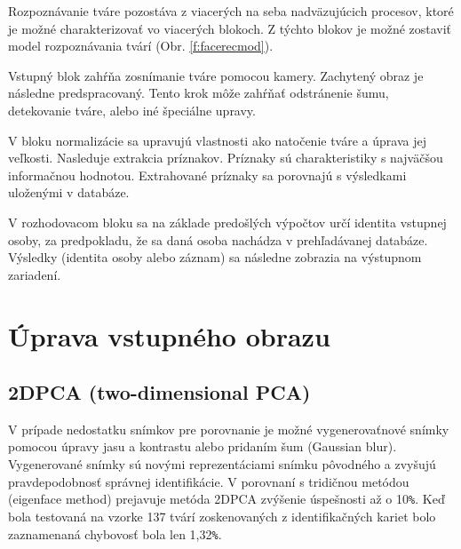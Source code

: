 \documentclass[10pt,twoside,slovak,a4paper]{article}
\begin{document}
Rozpoznávanie tváre pozostáva z viacerých na seba nadväzujúcich procesov, ktoré je možné
charakterizovať vo viacerých blokoch. Z týchto blokov je možné zostaviť model
rozpoznávania tvárí (Obr.  \ref{f:facerecmod}).

Vstupný blok zahŕňa zosnímanie tváre pomocou kamery. Zachytený obraz je následne
predspracovaný. Tento krok môže zahŕňať odstránenie šumu, detekovanie tváre, alebo iné
špeciálne upravy.

V bloku normalizácie sa upravujú vlastnosti ako natočenie tváre a úprava jej veľkosti.
Nasleduje extrakcia príznakov. Príznaky sú charakteristiky s najväčšou informačnou hodnotou.
Extrahované príznaky sa porovnajú s výsledkami uloženými v databáze.

V rozhodovacom bloku sa na základe predošlých výpočtov určí identita vstupnej osoby, za
predpokladu, že sa daná osoba nachádza v prehľadávanej databáze.
Výsledky (identita osoby alebo záznam) sa následne zobrazia na výstupnom zariadení.\cite{Ban1}







\section{Úprava vstupného obrazu} \label{nejaka}



\subsection{2DPCA (two-dimensional PCA)} \label{2DPCA}



V prípade nedostatku snímkov pre porovnanie je možné vygenerovaťnové snímky pomocou úpravy jasu a kontrastu alebo pridaním šum (Gaussian blur). Vygenerované snímky sú novými reprezentáciami snímku pôvodného a zvyšujú pravdepodobnosť správnej identifikácie. V porovnaní s tridičnou metódou (eigenface method) prejavuje metóda 2DPCA zvýšenie úspešnosti až o 10\texttt{\%}.
Keď bola testovaná na vzorke 137 tvárí zoskenovaných z identifikačných kariet bolo zaznamenaná chybovosť bola len 1,32\texttt{\%}.\cite{article1}
\end{document}
